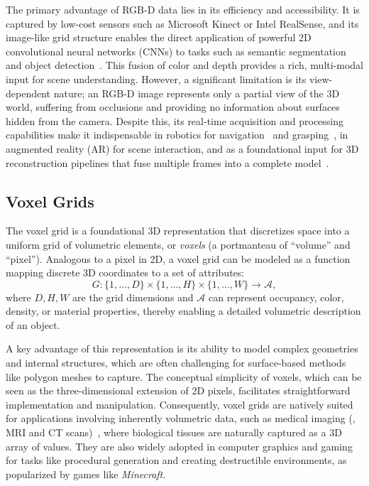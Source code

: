 The primary advantage of RGB-D data lies in its efficiency and accessibility.
It is captured by low-cost sensors such as Microsoft Kinect or Intel RealSense, and its image-like grid structure enables the direct application of powerful 2D convolutional neural networks (CNNs) to tasks such as semantic segmentation and object detection~\cite{dai2016r,couprie2013indoor,vu2019dada}.
This fusion of color and depth provides a rich, multi-modal input for scene understanding.
However, a significant limitation is its view-dependent nature; an RGB-D image represents only a partial view of the 3D world, suffering from occlusions and providing no information about surfaces hidden from the camera.
Despite this, its real-time acquisition and processing capabilities make it indispensable in robotics for navigation~\cite{desouza2002vision} and grasping~\cite{bicchi2000robotic,saxena2006robotic,zhao2025towards}, in augmented reality (AR) for scene interaction, and as a foundational input for 3D reconstruction pipelines that fuse multiple frames into a complete model~\cite{newcombe2011kinectfusion}.







\subsection{Voxel Grids}
\label{sec:rep_3d_voxel}

The voxel grid is a foundational 3D representation that discretizes space into a uniform grid of volumetric elements, or \textit{voxels} (a portmanteau of ``volume'' and ``pixel'').
Analogous to a pixel in 2D, a voxel grid can be modeled as a function mapping discrete 3D coordinates to a set of attributes:
\begin{equation}
G: \{1, \dots, D\} \times \{1, \dots, H\} \times \{1, \dots, W\} \rightarrow \mathcal{A},
\end{equation}
where $D, H, W$ are the grid dimensions and $\mathcal{A}$ can represent occupancy, color, density, or material properties, thereby enabling a detailed volumetric description of an object.

A key advantage of this representation is its ability to model complex geometries and internal structures, which are often challenging for surface-based methods like polygon meshes to capture.
The conceptual simplicity of voxels, which can be seen as the three-dimensional extension of 2D pixels, facilitates straightforward implementation and manipulation.
Consequently, voxel grids are natively suited for applications involving inherently volumetric data, such as medical imaging (\eg, MRI and CT scans)~\cite{cciccek20163d}, where biological tissues are naturally captured as a 3D array of values.
They are also widely adopted in computer graphics and gaming for tasks like procedural generation and creating destructible environments, as popularized by games like \textit{Minecraft}.

